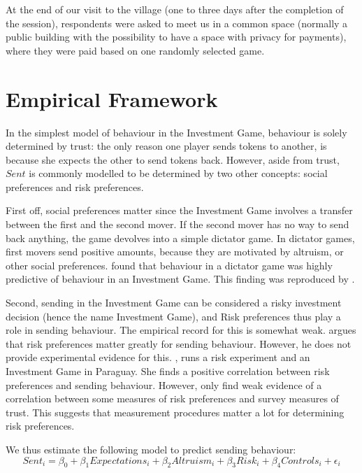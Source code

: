 At the end of our visit to the village (one to three days after the completion of the session), respondents were asked to meet us in a common space (normally a public building with the possibility to have a space with privacy for payments), where they were paid based on one randomly selected game.


\section{Empirical Framework}
In the simplest model of behaviour in the Investment Game, behaviour is solely determined by trust: the only reason one player sends tokens to another, is because she expects the other to send tokens back. However, aside from trust, $Sent$  is commonly modelled to be determined by two other concepts: social preferences and risk preferences. 

First off, social preferences matter since the Investment Game involves a transfer between the first and the second mover. If the second mover has no way to send back anything, the game devolves into a simple dictator game. In dictator games, first movers send positive amounts, because they are motivated by altruism, or other social preferences. \cite{Cox2004} found that behaviour in a dictator game was highly predictive of behaviour in an Investment Game. This finding was reproduced by \citep{Ashraf2006}.

Second, sending in the Investment Game can be considered a risky investment decision (hence the name Investment Game), and Risk preferences thus play a role in sending behaviour. The empirical record for this is somewhat weak. \cite{Karlan2005} argues that risk preferences matter greatly for sending behaviour. However, he does not provide experimental evidence for this. \cite{Schechter2007}, runs a risk experiment and an Investment Game in Paraguay. She finds a positive correlation between risk preferences and sending behaviour. However,  \cite{Eckel2004} only find weak evidence of a correlation between some measures of risk preferences and survey measures of trust. This suggests that measurement procedures matter a lot for determining risk preferences.

We thus estimate the following model to predict sending behaviour:
\begin{equation}
\label{eq:simple}
Sent_i = \beta_0 + \beta_1 Expectations_i + \beta_2 Altruism_i + \beta_3 Risk_i + \beta_4 Controls_i + \epsilon_i 
\end{equation} 

